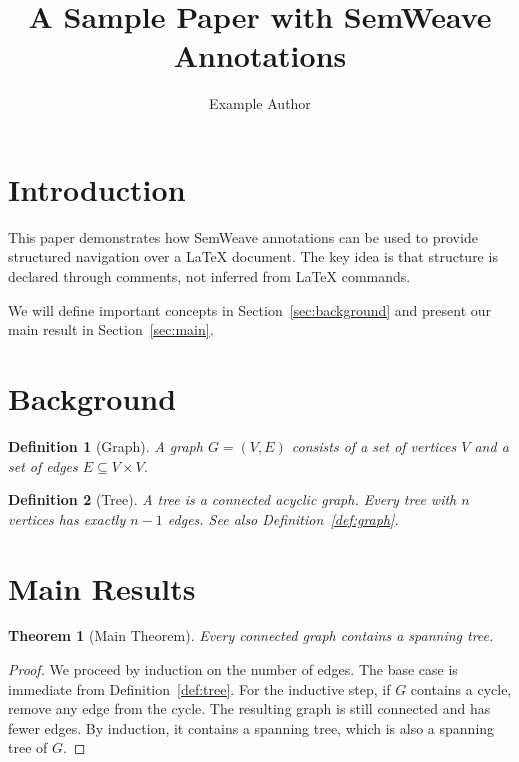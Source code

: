 \documentclass{article}
\title{A Sample Paper with SemWeave Annotations}
\author{Example Author}
\newtheorem{theorem}{Theorem}
\newtheorem{definition}{Definition}
\begin{document}
\maketitle

\section{Introduction}

This paper demonstrates how SemWeave annotations can be used to provide
structured navigation over a LaTeX document. The key idea is that structure
is declared through comments, not inferred from LaTeX commands.

We will define important concepts in Section~\ref{sec:background} and
present our main result in Section~\ref{sec:main}.

\section{Background}

\begin{definition}[Graph]
A graph $G = (V, E)$ consists of a set of vertices $V$ and a set of
edges $E \subseteq V \times V$.
\end{definition}

\begin{definition}[Tree]
A tree is a connected acyclic graph. Every tree with $n$ vertices has
exactly $n-1$ edges. See also Definition~\ref{def:graph}.
\end{definition}


\section{Main Results}

\begin{theorem}[Main Theorem]
Every connected graph contains a spanning tree.
\end{theorem}

\begin{proof}
We proceed by induction on the number of edges. The base case is
immediate from Definition~\ref{def:tree}. For the inductive step,
if $G$ contains a cycle, remove any edge from the cycle. The resulting
graph is still connected and has fewer edges. By induction, it contains
a spanning tree, which is also a spanning tree of $G$.
\end{proof}
\end{document}
